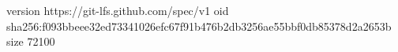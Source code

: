 version https://git-lfs.github.com/spec/v1
oid sha256:f093bbeee32ed73341026efc67f91b476b2db3256ae55bbf0db85378d2a2653b
size 72100
